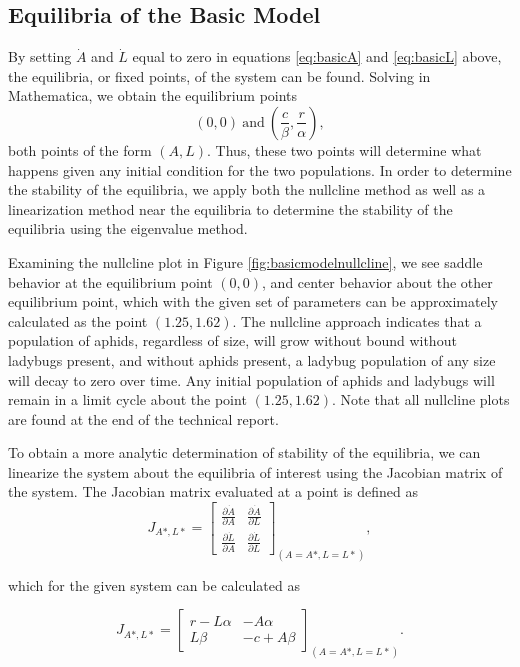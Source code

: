 \documentclass[10pt]{article}
\begin{document}
\subsection{Equilibria of the Basic Model}

By setting \(\dot{A}\) and \(\dot{L}\) equal to zero in equations \ref{eq:basicA} and \ref{eq:basicL} above, the equilibria, or fixed points, of the system can be found. Solving in Mathematica, we obtain the equilibrium points 
\[(0,0) \ \mathrm{and} \ \left( \frac{c}{\beta},\frac{r}{\alpha} \right),\]
both points of the form \((A,L)\). Thus, these two points will determine what happens given any initial condition for the two populations. In order to determine the stability of the equilibria, we apply both the nullcline method as well as a linearization method near the equilibria to determine the stability of the equilibria using the eigenvalue method.

Examining the nullcline plot in Figure \ref{fig:basicmodelnullcline}, we see saddle behavior at the equilibrium point \( (0,0) \), and center behavior about the other equilibrium point, which with the given set of parameters can be approximately calculated as the point $(1.25,1.62)$. The nullcline approach indicates that a population of aphids, regardless of size, will grow without bound without ladybugs present, and without aphids present, a ladybug population of any size will decay to zero over time. Any initial population of aphids and ladybugs will remain in a limit cycle about the point $(1.25,1.62)$. Note that all nullcline plots are found at the end of the technical report.

To obtain a more analytic determination of stability of the equilibria, we can linearize the system about the equilibria of interest using the Jacobian matrix of the system. The Jacobian matrix evaluated at a point is defined as 
\[ J_{A*,L*} = 
\begin{bmatrix}
\frac{\partial \dot{A}}{\partial A} & \frac{\partial \dot{A}}{\partial L} \\[1ex]
\frac{\partial \dot{L}}{\partial A} & \frac{\partial \dot{L}}{\partial L}
\end{bmatrix}_{(A=A*,L=L*)}, \]

which for the given system can be calculated as

\[ J_{A*,L*} = 
\begin{bmatrix}
r-L\alpha & -A\alpha \\[1ex]
L\beta & -c+A\beta
\end{bmatrix}_{(A=A*,L=L*)}. \]
\end{document}
